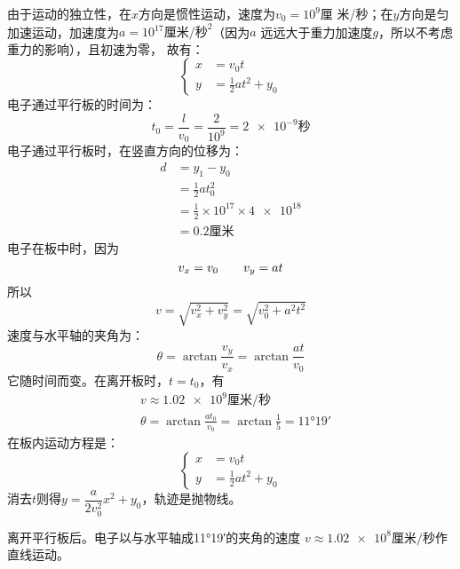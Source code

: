 由于运动的独立性，在$x$方向是惯性运动，速度为$v_0=10^9$厘
米/秒；在$y$方向是匀加速运动，加速度为$a=10^{17}\text{厘米/秒}^2$（因为$a$
远远大于重力加速度$g$，所以不考虑重力的影响），且初速为零，
故有：
\begin{equation*}
    \left\lbrace \begin{aligned}
        x & =v_0 t               \\
        y & =\frac{1}{2}at^2+y_0
    \end{aligned}\right.
\end{equation*}
电子通过平行板的时间为：
\begin{equation*}
    t_0=\frac{l}{v_0}=\frac{2}{10^{9}}=\num{2e-9}\text{秒}
\end{equation*}
电子通过平行板时，在竖直方向的位移为：
\begin{align*}
    d & =y_1-y_0                                     \\
      & =\frac{1}{2}at_0^2                           \\
      & =\frac{1}{2}\times 10^{17} \times \num{4e18} \\
      & =0.2\text{厘米}
\end{align*}
电子在板中时，因为
\begin{equation*}
    v_x=v_0 \qquad v_y=at \\
\end{equation*}
所以
\begin{equation*}
    v=\sqrt{v_x^2+v_y^2}=\sqrt{v_0^2 + a^2 t^2}
\end{equation*}
速度与水平轴的夹角为：
\begin{equation*}
    \theta = \arctan\frac{v_y}{v_x} = \arctan\frac{at}{v_0}
\end{equation*}
它随时间而变。在离开板时，$t=t_0$，有
\begin{align*}
     & v \approx \num{1.02e9}\text{厘米/秒}                           \\
     & \theta = \arctan\frac{at_0}{v_0} =\arctan\frac 1 5=\ang{11;19;}
\end{align*}
在板内运动方程是：
\begin{equation*}
    \left\lbrace \begin{aligned}
        x & =v_0 t               \\
        y & =\frac{1}{2}at^2+y_0
    \end{aligned}\right.
\end{equation*}
消去$t$则得$y=\dfrac{a}{2v_0^2}x^2+y_0$，轨迹是抛物线。

离开平行板后。电子以与水平轴成\ang{11;19;}的夹角的速度
$v\approx\num{1.02e8}\text{厘米/秒}$作直线运动。

